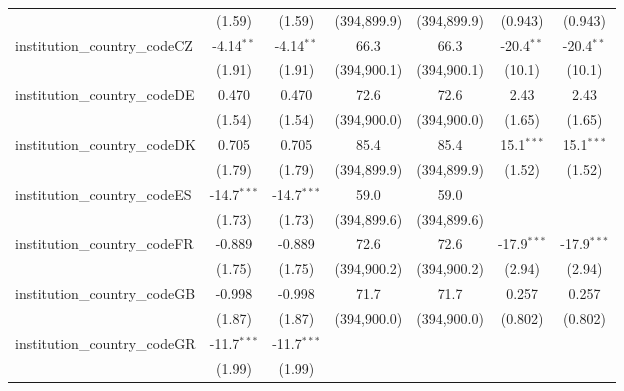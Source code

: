 \begin{tabular}{lcccccc}
                                         & (1.59)        & (1.59)        & (394,899.9)   & (394,899.9)   & (0.943)       & (0.943)\\   
   institution\_country\_codeCZ          & -4.14$^{**}$  & -4.14$^{**}$  & 66.3          & 66.3          & -20.4$^{**}$  & -20.4$^{**}$\\   
                                         & (1.91)        & (1.91)        & (394,900.1)   & (394,900.1)   & (10.1)        & (10.1)\\   
   institution\_country\_codeDE          & 0.470         & 0.470         & 72.6          & 72.6          & 2.43          & 2.43\\   
                                         & (1.54)        & (1.54)        & (394,900.0)   & (394,900.0)   & (1.65)        & (1.65)\\   
   institution\_country\_codeDK          & 0.705         & 0.705         & 85.4          & 85.4          & 15.1$^{***}$  & 15.1$^{***}$\\   
                                         & (1.79)        & (1.79)        & (394,899.9)   & (394,899.9)   & (1.52)        & (1.52)\\   
   institution\_country\_codeES          & -14.7$^{***}$ & -14.7$^{***}$ & 59.0          & 59.0          &               &   \\   
                                         & (1.73)        & (1.73)        & (394,899.6)   & (394,899.6)   &               &   \\   
   institution\_country\_codeFR          & -0.889        & -0.889        & 72.6          & 72.6          & -17.9$^{***}$ & -17.9$^{***}$\\   
                                         & (1.75)        & (1.75)        & (394,900.2)   & (394,900.2)   & (2.94)        & (2.94)\\   
   institution\_country\_codeGB          & -0.998        & -0.998        & 71.7          & 71.7          & 0.257         & 0.257\\   
                                         & (1.87)        & (1.87)        & (394,900.0)   & (394,900.0)   & (0.802)       & (0.802)\\   
   institution\_country\_codeGR          & -11.7$^{***}$ & -11.7$^{***}$ &               &               &               &   \\   
                                         & (1.99)        & (1.99)        &               &               &               &   \\   

\end{tabular}
